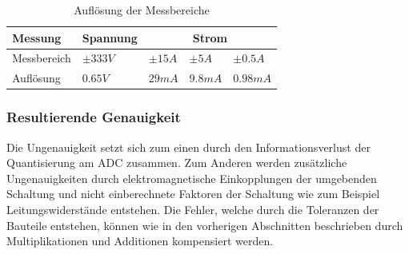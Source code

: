 \begin{table}[H]
\centering
\begin{tabular}{|l|l|l|l|l|}
\hline
Messung     & Spannung  & \multicolumn{3}{c|}{Strom}     \\ \hline
Messbereich & $\pm333V$ & $\pm15A$ & $\pm5A$ & $\pm0.5A$ \\ \hline
Auflösung   & $0.65V$   & $29mA$   & $9.8mA$ & $0.98mA$  \\ \hline
\end{tabular}
\caption{Auflösung der Messbereiche}
\label{tab:auflösung}
\end{table}

\subsubsection*{Resultierende Genauigkeit} 
Die Ungenauigkeit setzt sich zum einen durch den Informationsverlust der Quantisierung am ADC zusammen. Zum Anderen werden zusätzliche Ungenauigkeiten durch elektromagnetische Einkopplungen der umgebenden Schaltung und nicht einberechnete Faktoren der Schaltung wie zum Beispiel Leitungswiderstände entstehen. Die Fehler, welche durch die Toleranzen der Bauteile entstehen, können wie in den vorherigen Abschnitten beschrieben durch Multiplikationen und Additionen kompensiert werden.



\pagebreak